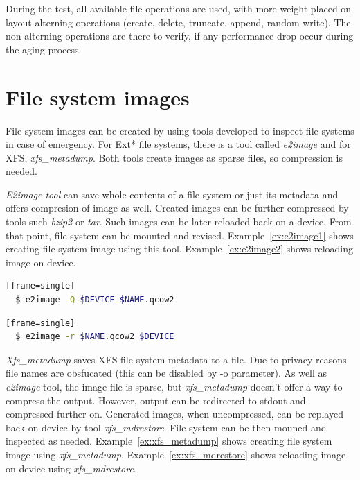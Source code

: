 \documentclass[
  color, %
  table, %
  lof,   %
  lot,   %
]{fithesis3}
\begin{document}
During the test, all available file operations are used, with more weight placed on layout alterning operations (create, delete, truncate, append, random write). The non-alterning operations are there to verify, if any performance drop occur during the aging process.

\section{File system images}
File system images can be created by using tools developed to inspect file systems in case of emergency. For Ext* file systems, there is a tool called \textit{e2image} and for XFS, \textit{xfs\_metadump}. Both tools create images as sparse files, so compression is needed.

\textit{E2image tool} can save whole contents of a file system or just its metadata and offers compresion of image as well. Created images can be further compressed by tools such \textit{bzip2} or \textit{tar}. Such images can be later reloaded back on a device. From that point, file system can be mounted and revised. Example~\ref{ex:e2image1} shows creating file system image using this tool. Example~\ref{ex:e2image2} shows reloading image on device.


\begin{lstlisting}[language=bash, label={ex:e2image1}, caption={Creating compressed image using \textit{e2image}}][frame=single]
  $ e2image -Q $DEVICE $NAME.qcow2
\end{lstlisting}

\begin{lstlisting}[language=bash, label={ex:e2image2}, caption={Reloading compressed image}][frame=single]
  $ e2image -r $NAME.qcow2 $DEVICE
\end{lstlisting}

\textit{Xfs\_metadump} saves XFS file system metadata to a file. Due to privacy reasons file names are obsfucated (this can be disabled by -o parameter). As well as \textit{e2image} tool, the image file is sparse, but \textit{xfs\_metadump} doesn't offer a way to compress the output. However, output can be redirected to stdout and compressed further on. Generated images, when uncompressed, can be replayed back on device by tool \textit{xfs\_mdrestore}. File system can be then mouned and inspected as needed. Example~\ref{ex:xfs_metadump} shows creating file system image using \textit{xfs\_metadump}. Example~\ref{ex:xfs_mdrestore} shows reloading image on device using \textit{xfs\_mdrestore}.
\end{document}

